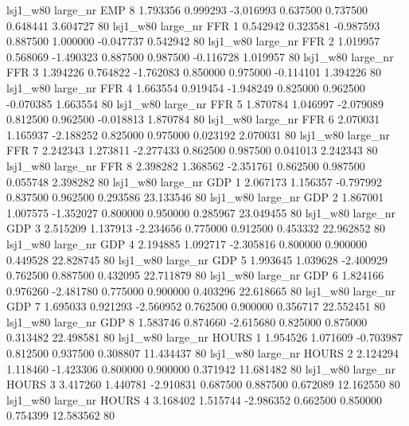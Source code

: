     lsj1_w80   large_nr      EMP                 8  1.793356  0.999293  -3.016993 0.637500 0.737500  0.648441    3.604727 80
    lsj1_w80   large_nr      FFR                 1  0.542942  0.323581  -0.987593 0.887500 1.000000 -0.047737    0.542942 80
    lsj1_w80   large_nr      FFR                 2  1.019957  0.568069  -1.490323 0.887500 0.987500 -0.116728    1.019957 80
    lsj1_w80   large_nr      FFR                 3  1.394226  0.764822  -1.762083 0.850000 0.975000 -0.114101    1.394226 80
    lsj1_w80   large_nr      FFR                 4  1.663554  0.919454  -1.948249 0.825000 0.962500 -0.070385    1.663554 80
    lsj1_w80   large_nr      FFR                 5  1.870784  1.046997  -2.079089 0.812500 0.962500 -0.018813    1.870784 80
    lsj1_w80   large_nr      FFR                 6  2.070031  1.165937  -2.188252 0.825000 0.975000  0.023192    2.070031 80
    lsj1_w80   large_nr      FFR                 7  2.242343  1.273811  -2.277433 0.862500 0.987500  0.041013    2.242343 80
    lsj1_w80   large_nr      FFR                 8  2.398282  1.368562  -2.351761 0.862500 0.987500  0.055748    2.398282 80
    lsj1_w80   large_nr      GDP                 1  2.067173  1.156357  -0.797992 0.837500 0.962500  0.293586   23.133546 80
    lsj1_w80   large_nr      GDP                 2  1.867001  1.007575  -1.352027 0.800000 0.950000  0.285967   23.049455 80
    lsj1_w80   large_nr      GDP                 3  2.515209  1.137913  -2.234656 0.775000 0.912500  0.453332   22.962852 80
    lsj1_w80   large_nr      GDP                 4  2.194885  1.092717  -2.305816 0.800000 0.900000  0.449528   22.828745 80
    lsj1_w80   large_nr      GDP                 5  1.993645  1.039628  -2.400929 0.762500 0.887500  0.432095   22.711879 80
    lsj1_w80   large_nr      GDP                 6  1.824166  0.976260  -2.481780 0.775000 0.900000  0.403296   22.618665 80
    lsj1_w80   large_nr      GDP                 7  1.695033  0.921293  -2.560952 0.762500 0.900000  0.356717   22.552451 80
    lsj1_w80   large_nr      GDP                 8  1.583746  0.874660  -2.615680 0.825000 0.875000  0.313482   22.498581 80
    lsj1_w80   large_nr    HOURS                 1  1.954526  1.071609  -0.703987 0.812500 0.937500  0.308807   11.434437 80
    lsj1_w80   large_nr    HOURS                 2  2.124294  1.118460  -1.423306 0.800000 0.900000  0.371942   11.681482 80
    lsj1_w80   large_nr    HOURS                 3  3.417260  1.440781  -2.910831 0.687500 0.887500  0.672089   12.162550 80
    lsj1_w80   large_nr    HOURS                 4  3.168402  1.515744  -2.986352 0.662500 0.850000  0.754399   12.583562 80
